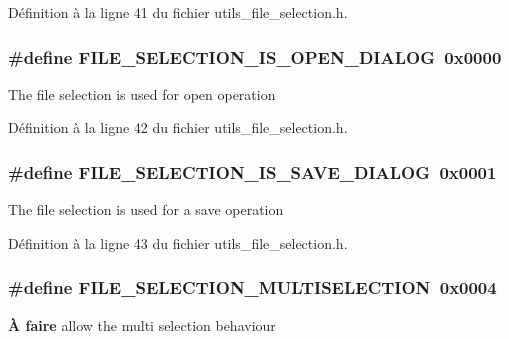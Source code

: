 Définition à la ligne 41 du fichier utils\_\-file\_\-selection.h.

\subsubsection[{FILE\_\-SELECTION\_\-IS\_\-OPEN\_\-DIALOG}]{\setlength{\rightskip}{0pt plus 5cm}\#define FILE\_\-SELECTION\_\-IS\_\-OPEN\_\-DIALOG~0x0000}\label{utils__file__selection_8h_a479801e1efb641420a3be56732ebca77}
The file selection is used for open operation 

Définition à la ligne 42 du fichier utils\_\-file\_\-selection.h.

\subsubsection[{FILE\_\-SELECTION\_\-IS\_\-SAVE\_\-DIALOG}]{\setlength{\rightskip}{0pt plus 5cm}\#define FILE\_\-SELECTION\_\-IS\_\-SAVE\_\-DIALOG~0x0001}\label{utils__file__selection_8h_a823595fd9dc58c9b9005a98335efd74e}
The file selection is used for a save operation 

Définition à la ligne 43 du fichier utils\_\-file\_\-selection.h.

\subsubsection[{FILE\_\-SELECTION\_\-MULTISELECTION}]{\setlength{\rightskip}{0pt plus 5cm}\#define FILE\_\-SELECTION\_\-MULTISELECTION~0x0004}\label{utils__file__selection_8h_a9191727402ba314f35438f00153815a0}
\begin{Desc}
\item[{\bf À faire}]allow the multi selection behaviour \end{Desc}


